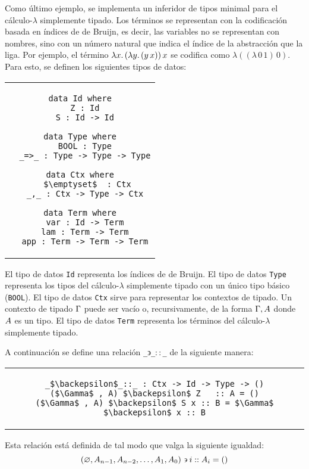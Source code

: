 Como último ejemplo, se implementa un inferidor de tipos minimal
para el cálculo-$\lambda$ simplemente tipado.
Los términos se representan con la codificación basada en índices de de Bruijn,
es decir, las variables no se representan con nombres, sino con un número
natural que indica el índice de la abstracción que la liga.
Por ejemplo, el término $\lambda x.\,(\lambda y.\,(y\,x))\,x$
se codifica como $\lambda((\lambda\,0\,1)\,0)$.
Para esto, se definen los siguientes tipos de datos:

\begin{center}
\begin{tabular}{c}
\begin{lstlisting}[mathescape=true]
data Id where
  Z : Id
  S : Id -> Id

data Type where
  BOOL : Type
  _=>_ : Type -> Type -> Type

data Ctx where
   $\emptyset$  : Ctx
  _,_ : Ctx -> Type -> Ctx

data Term where
  var : Id -> Term
  lam : Term -> Term
  app : Term -> Term -> Term
\end{lstlisting}
\end{tabular}
\end{center}
El tipo de datos \verb|Id| representa los índices de de Bruijn.
El tipo de datos \verb|Type| representa
los tipos del cálculo-$\lambda$ simplemente tipado con un único tipo básico (\verb|BOOL|).
El tipo de datos \verb|Ctx| sirve para representar los contextos de tipado.
Un contexto de tipado $\Gamma$ puede ser vacío o, recursivamente, de la forma $\Gamma,A$
donde $A$ es un tipo.
El tipo de datos \verb|Term| representa los términos del cálculo-$\lambda$
simplemente tipado.
\bigskip

A continuación se define una relación \texttt{\_$\backepsilon$\_$::$\_}
de la siguiente manera:
\begin{center}
\begin{tabular}{c}
\begin{lstlisting}[mathescape=true]
_$\backepsilon$_::_ : Ctx -> Id -> Type -> ()
($\Gamma$ , A) $\backepsilon$ Z   :: A = ()
($\Gamma$ , A) $\backepsilon$ S x :: B = $\Gamma$ $\backepsilon$ x :: B
\end{lstlisting}
\end{tabular}
\end{center}
Esta relación está definida de tal modo que valga la siguiente igualdad:
\[
  (\varnothing,A_{n-1},A_{n-2},\hdots,A_1,A_0) \backepsilon i :: A_i = ()
\]
\bigskip

